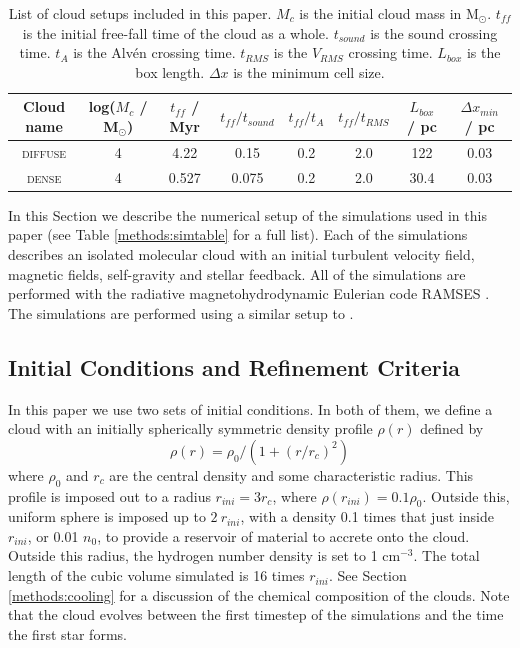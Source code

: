 \documentclass[a4paper,fleqn,usenatbib]{mnras}
\newcommand{\Msolar}{M$_{\odot}$\xspace}
\begin{document}
\begin{table}
	\centering
	\caption{List of cloud setups included in this paper. $M_c$ is the initial cloud mass in \Msolar. $t_{ff}$ is the initial free-fall time of the cloud as a whole. $t_{sound}$ is the sound crossing time. $t_{A}$ is the Alv\'en crossing time. $t_{RMS}$ is the $V_{RMS}$ crossing time. $L_{box}$ is the box length. $\Delta x$ is the minimum cell size.}
	\label{methods:cloudtable}
	\begin{tabular}{cccccccc} %
		\hline
		Cloud name & log($M_c$ / M$_\odot$) & $t_{ff}$ / Myr & $t_{ff}/t_{sound}$ & $t_{ff}/t_{A}$ & $t_{ff}/t_{RMS}$ & $L_{box}$ / pc & $\Delta x_{min}$ / pc \\
		\hline
		\textsc{diffuse} & 4                & 4.22            & 0.15               & 0.2            & 2.0              & 122            & 0.03 \\
		\textsc{dense}   & 4                & 0.527           & 0.075              & 0.2            & 2.0              & 30.4            & 0.03 \\
	\end{tabular}
\end{table}

In this Section we describe the numerical setup of the simulations used in this paper (see Table \ref{methods:simtable} for a full list). Each of the simulations describes an isolated molecular cloud with an initial turbulent velocity field, magnetic fields, self-gravity and stellar feedback. All of the simulations are performed with the radiative magnetohydrodynamic Eulerian \AMR code \textsc{RAMSES} \citep{Teyssier2002,Fromang2006,Rosdahl2013}. The simulations are performed using a similar setup to \citet{Geen2018}. 

\subsection{Initial Conditions and Refinement Criteria}

In this paper we use two sets of initial conditions. In both of them, we define a cloud with an initially spherically symmetric density profile $\rho(r)$ defined by
\begin{equation}
\rho(r) = \rho_0 / (1 + (r/r_c)^2)
\label{isothermal}
\end{equation}
where $\rho_0$ and $r_c$ are the central density and some characteristic radius. This profile is imposed out to a radius $r_{ini}=3 r_c$, where $\rho(r_{ini})=0.1 \rho_0$. Outside this, uniform sphere is imposed up to $2~r_{ini}$, with a density 0.1 times that just inside $r_{ini}$, or 0.01 $n_0$, to provide a reservoir of material to accrete onto the cloud. Outside this radius, the hydrogen number density is set to 1 cm$^{-3}$. The total length of the cubic volume simulated is 16 times $r_{ini}$. See Section \ref{methods:cooling} for a discussion of the chemical composition of the clouds. Note that the cloud evolves between the first timestep of the simulations and the time the first star forms.
\end{document}
